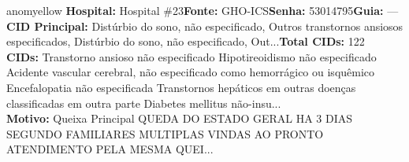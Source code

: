 \documentclass[a4paper,10pt]{article}
\begin{document}
\begin{anomalycard}[Interna\c{c}\~{a}o \#488 | Pac. \#69 | MODERADO (z=2.07) | LOS: 12d | 11/03/2026\,$\to$\,—]{anomyellow}
\textbf{Hospital:} Hospital \#23\quad \textbf{Fonte:} GHO-ICS\quad \textbf{Senha:} 53014795\quad \textbf{Guia:} ---\\

\textbf{CID Principal:} {\small Distúrbio do sono, não especificado, Outros transtornos ansiosos especificados, Distúrbio do sono, não especificado, Out...}\quad\textbf{Total CIDs:} 122\\

\textbf{CIDs:} {\scriptsize Transtorno ansioso não especificado \textbar{} Hipotireoidismo não especificado \textbar{} Acidente vascular cerebral, não especificado como hemorrágico ou isquêmico \textbar{} Encefalopatia não especificada \textbar{} Transtornos hepáticos em outras doenças classificadas em outra parte \textbar{} Diabetes mellitus não-insu...}\\

\textbf{Motivo:} {\scriptsize Queixa Principal    QUEDA DO ESTADO GERAL HA 3 DIAS SEGUNDO FAMILIARES   MULTIPLAS VINDAS AO PRONTO ATENDIMENTO PELA MESMA QUEI...}\\

\end{anomalycard}
\end{document}
